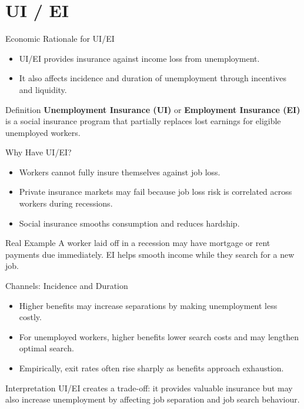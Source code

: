 \documentclass[aspectratio=169]{beamer}
\begin{document}
\section{UI / EI}

\begin{frame}{Economic Rationale for UI/EI}
\transfade
\begin{itemize}
  \item UI/EI provides insurance against income loss from unemployment.
  \item It also affects incidence and duration of unemployment through incentives and liquidity.
\end{itemize}

\begin{block}{Definition}
\textbf{Unemployment Insurance (UI)} or \textbf{Employment Insurance (EI)} is a social insurance program that partially replaces lost earnings for eligible unemployed workers.
\end{block}
\end{frame}

\begin{frame}{Why Have UI/EI?}
\transfade
\begin{itemize}
  \item Workers cannot fully insure themselves against job loss.
  \item Private insurance markets may fail because job loss risk is correlated across workers during recessions.
  \item Social insurance smooths consumption and reduces hardship.
\end{itemize}

\begin{exampleblock}{Real Example}
A worker laid off in a recession may have mortgage or rent payments due immediately. EI helps smooth income while they search for a new job.
\end{exampleblock}
\end{frame}

\begin{frame}{Channels: Incidence and Duration}
\transfade
\begin{itemize}
  \item Higher benefits may increase separations by making unemployment less costly.
  \item For unemployed workers, higher benefits lower search costs and may lengthen optimal search.
  \item Empirically, exit rates often rise sharply as benefits approach exhaustion.
\end{itemize}

\begin{block}{Interpretation}
UI/EI creates a trade-off: it provides valuable insurance but may also increase unemployment by affecting job separation and job search behaviour.
\end{block}
\end{frame}
\end{document}
